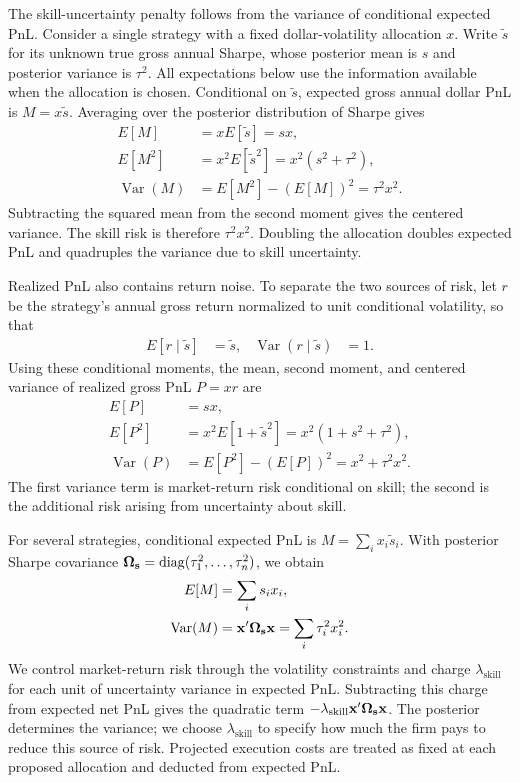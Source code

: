 \documentclass[11pt]{gappyarticle}
\begin{document}
The skill-uncertainty penalty follows from the variance of conditional
expected PnL. Consider a single strategy with a fixed dollar-volatility
allocation $x$. Write $\tilde s$ for its unknown true gross annual Sharpe,
whose posterior mean is $s$ and posterior variance is $\tau^2$.
All expectations below use the information available when the allocation
is chosen. Conditional on $\tilde s$, expected gross annual dollar PnL is
$M=x\tilde s$. Averaging over the posterior distribution of Sharpe gives
\begin{align}
    E[M] &= xE[\tilde s]=sx,\\
    E[M^2] &= x^2E[\tilde s^2]
             =x^2(s^2+\tau^2),\\
    \operatorname{Var}(M)
        &=E[M^2]-(E[M])^2=\tau^2x^2.
\end{align}
Subtracting the squared mean from the second moment gives the centered
variance. The skill risk is therefore $\tau^2x^2$. Doubling the allocation
doubles expected PnL and quadruples the variance due to skill uncertainty.

Realized PnL also contains return noise. To separate the two sources of
risk, let $r$ be the strategy's annual gross return normalized to unit
conditional volatility, so that
\begin{align}
    E[r\mid\tilde s]&=\tilde s,
    &\operatorname{Var}(r\mid\tilde s)&=1.
\end{align}
Using these conditional moments, the mean, second moment, and centered
variance of realized gross PnL $P=xr$ are
\begin{align}
    E[P]&=sx,\\
    E[P^2]&=x^2E[1+\tilde s^2]
             =x^2(1+s^2+\tau^2),\\
    \operatorname{Var}(P)
        &=E[P^2]-(E[P])^2=x^2+\tau^2x^2.
\end{align}
The first variance term is market-return risk conditional on skill; the
second is the additional risk arising from uncertainty about skill.

For several strategies, conditional expected PnL is
$M=\sum_i x_i\tilde s_i$. With posterior Sharpe covariance
${\boldsymbol{\Omega}}_{\mathbf{s}}=\operatorname{diag}(\tau_1^2,\ldots,\tau_n^2)$, we obtain
\begin{align}
    E[M]&=\sum_i s_i x_i,\\
    \operatorname{Var}(M)
        &={\mathbf{x}}'{\boldsymbol{\Omega}}_{\mathbf{s}}{\mathbf{x}}
          =\sum_i\tau_i^2x_i^2.
\end{align}
We control market-return risk through the volatility constraints and
charge $\lambda_{\mathrm{skill}}$ for each unit of uncertainty variance
in expected PnL. Subtracting this charge from expected net PnL gives the
quadratic term $-\lambda_{\mathrm{skill}}{\mathbf{x}}'{\boldsymbol{\Omega}}_{\mathbf{s}}{\mathbf{x}}$.
The posterior determines the variance; we choose
$\lambda_{\mathrm{skill}}$ to specify how much the firm pays to reduce
this source of risk. Projected execution costs are treated as fixed at
each proposed allocation and deducted from expected PnL.
\end{document}
